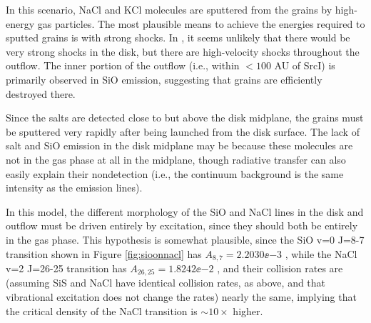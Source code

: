 \documentclass[twocolumn]{aastex62}
\newcommand{\sourcei}{SrcI\xspace}
\begin{document}




In this scenario,  NaCl and KCl molecules are sputtered from the grains by
high-energy gas particles.  The most plausible means to achieve the energies
required to sputted grains is with strong shocks.  In \sourci, it seems
unlikely that there would be very strong shocks in the disk, but there are
high-velocity shocks throughout the outflow.  The inner portion of the outflow
(i.e., within $<100$ AU of \sourcei) is primarily observed in SiO emission,
suggesting that grains are efficiently destroyed there.

Since the salts are detected close to but above the disk midplane, the
grains must be sputtered very rapidly after being launched from the disk surface.
The lack of salt and SiO emission in the disk midplane may be because these
molecules are not in the gas phase at all in the midplane, though radiative
transfer can also easily explain their nondetection (i.e., the continuum
background is the same intensity as the emission lines).


In this model, the different morphology of the SiO and NaCl lines in the disk
and outflow must be driven entirely by excitation, since they should both be
entirely in the gas phase.  This hypothesis is somewhat plausible, since the
SiO v=0 J=8-7 transition shown in Figure \ref{fig:sioonnacl} has $A_{8,7} =
2.2030\ee{-3}$ \pers, while the NaCl v=2 J=26-25 transition has $A_{26,25} =
1.8242\ee{-2}$ \pers, and their collision rates are (assuming SiS and NaCl have
identical collision rates, as above, and that vibrational excitation does not
change the rates) nearly the same, implying that the critical density of the
NaCl transition is $\sim10\times$ higher.
\end{document}

